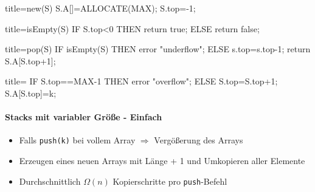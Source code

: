 \documentclass[
    ngerman,
    color=3b,
    dark_mode,
    summary,
    boxarc,
]{rubos-tuda-template}
\begin{document}
\begin{minipage}[t]{.5\textwidth-1pt}\mbox{}
    \begin{codeBlock}[autogobble]{title=new(S)}
        S.A[]=ALLOCATE(MAX);
        S.top=-1;
    \end{codeBlock}
\end{minipage}\hspace{2pt}%
\begin{minipage}[t]{.5\textwidth-1pt}\mbox{}
    \begin{codeBlock}[autogobble]{title=isEmpty(S)}
        IF S.top<0 THEN
          return true;
        ELSE
          return false;
    \end{codeBlock}
\end{minipage}
\begin{minipage}[t]{.5\textwidth-1pt}\mbox{}
    \begin{codeBlock}[autogobble]{title=pop(S)}
        IF isEmpty(S) THEN
          error "underflow";
        ELSE
          s.top=s.top-1;
          return S.A[S.top+1];
    \end{codeBlock}
\end{minipage}\hspace{2pt}%
\begin{minipage}[t]{.5\textwidth-1pt}\mbox{}
    \begin{codeBlock}[autogobble]{title=}
        IF S.top==MAX-1 THEN
          error "overflow";
        ELSE
          S.top=S.top+1;
          S.A[S.top]=k;
    \end{codeBlock}
\end{minipage}

\paragraph{Stacks mit variabler Grö\ss{}e - Einfach}
\begin{itemize}
    \item Falls \texttt{push(k)} bei vollem Array $\Rightarrow$ Vergö\ss{}erung des Arrays
    \item Erzeugen eines neuen Arrays mit Länge + 1 und Umkopieren aller Elemente
    \item Durchschnittlich $\Omega(n)$ Kopierschritte pro \texttt{push}-Befehl
\end{itemize}
\clearpage
\end{document}
